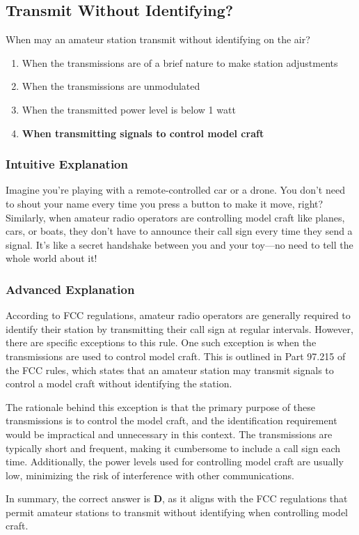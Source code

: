 \subsection{Transmit Without Identifying?}
\label{T1D11}

\begin{tcolorbox}[colback=gray!10!white,colframe=black!75!black,title=T1D11]
When may an amateur station transmit without identifying on the air?
\begin{enumerate}[label=\Alph*]
    \item When the transmissions are of a brief nature to make station adjustments
    \item When the transmissions are unmodulated
    \item When the transmitted power level is below 1 watt
    \item \textbf{When transmitting signals to control model craft}
\end{enumerate}
\end{tcolorbox}

\subsubsection{Intuitive Explanation}
Imagine you're playing with a remote-controlled car or a drone. You don't need to shout your name every time you press a button to make it move, right? Similarly, when amateur radio operators are controlling model craft like planes, cars, or boats, they don't have to announce their call sign every time they send a signal. It's like a secret handshake between you and your toy—no need to tell the whole world about it!

\subsubsection{Advanced Explanation}
According to FCC regulations, amateur radio operators are generally required to identify their station by transmitting their call sign at regular intervals. However, there are specific exceptions to this rule. One such exception is when the transmissions are used to control model craft. This is outlined in Part 97.215 of the FCC rules, which states that an amateur station may transmit signals to control a model craft without identifying the station.

The rationale behind this exception is that the primary purpose of these transmissions is to control the model craft, and the identification requirement would be impractical and unnecessary in this context. The transmissions are typically short and frequent, making it cumbersome to include a call sign each time. Additionally, the power levels used for controlling model craft are usually low, minimizing the risk of interference with other communications.

In summary, the correct answer is \textbf{D}, as it aligns with the FCC regulations that permit amateur stations to transmit without identifying when controlling model craft.

